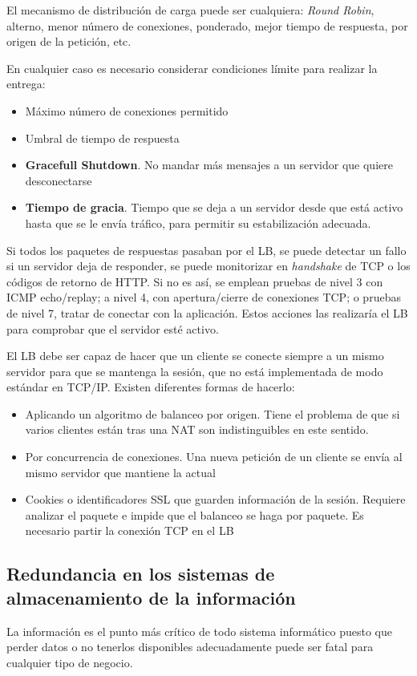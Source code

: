 El mecanismo de distribución de carga puede ser cualquiera: \textit{Round Robin}, alterno, menor número de conexiones, ponderado, mejor tiempo de respuesta, por origen de la petición, etc.

En cualquier caso es necesario considerar condiciones límite para realizar la entrega:
\begin{itemize}
\item Máximo número de conexiones permitido
\item Umbral de tiempo de respuesta
\item \textbf{Gracefull Shutdown}. No mandar más mensajes a un servidor que quiere desconectarse
\item \textbf{Tiempo de gracia}. Tiempo que se deja a un servidor desde que está activo hasta que se le envía tráfico, para permitir su estabilización adecuada.
\end{itemize}

Si todos los paquetes de respuestas pasaban por el LB, se puede detectar un fallo si un servidor deja de responder, se puede monitorizar en \textit{handshake} de TCP o los códigos de retorno de HTTP. Si no es así, se emplean pruebas de nivel 3 con ICMP echo/replay; a nivel 4, con apertura/cierre de conexiones TCP; o pruebas de nivel 7, tratar de conectar con la aplicación. Estos acciones las realizaría el LB para comprobar que el servidor esté activo.

El LB debe ser capaz de hacer que un cliente se conecte siempre a un mismo servidor para que se mantenga la sesión, que no está implementada de modo estándar en TCP/IP. Existen diferentes formas de hacerlo:
\begin{itemize}
\item Aplicando un algoritmo de balanceo por origen. Tiene el problema de que si varios clientes están tras una NAT son indistinguibles en este sentido.
\item Por concurrencia de conexiones. Una nueva petición de un cliente se envía al mismo servidor que mantiene la actual
\item Cookies o identificadores SSL que guarden información de la sesión. Requiere analizar el paquete e impide que el balanceo se haga por paquete. Es necesario partir la conexión TCP en el LB
\end{itemize}

\subsection{Redundancia en los sistemas de almacenamiento de la información}
La información es el punto más crítico de todo sistema informático puesto que perder datos o no tenerlos disponibles adecuadamente puede ser fatal para cualquier tipo de negocio.

